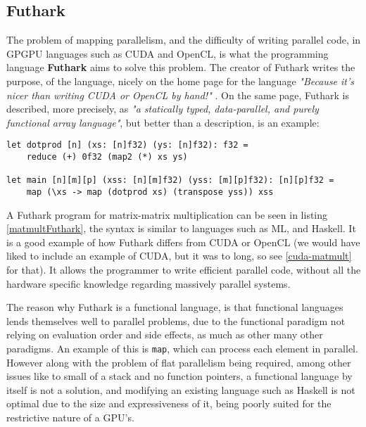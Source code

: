 \subsection{Futhark}
The problem of mapping parallelism, and the difficulty of writing parallel code, in GPGPU languages such as CUDA and OpenCL, is what the programming language \textbf{Futhark} aims to solve this problem. The creator of Futhark writes the purpose, of the language, nicely on the home page for the language \textit{"Because it’s nicer than writing CUDA or OpenCL by hand!"} \cite{futhark-home}. On the same page, Futhark is described, more precisely, as \textit{"a statically typed, data-parallel, and purely functional array language"}, but better than a description, is an example:
\begin{center}
\lstset{language=haskell}
\begin{lstlisting}
let dotprod [n] (xs: [n]f32) (ys: [n]f32): f32 =
	reduce (+) 0f32 (map2 (*) xs ys)

let main [n][m][p] (xss: [n][m]f32) (yss: [m][p]f32): [n][p]f32 =
	map (\xs -> map (dotprod xs) (transpose yss)) xss
\end{lstlisting}%
\label{matmultFuthark}
\end{center}
A Futhark program for matrix-matrix multiplication can be seen in listing \ref{matmultFuthark}, the syntax is similar to languages such as ML, and Haskell. It is a good example of how Futhark differs from CUDA or OpenCL (we would have liked to include an example of CUDA, but it was to long, so see \ref{cuda-matmult} for that). It allows the programmer to write efficient parallel code, without all the hardware specific knowledge regarding massively parallel systems. 

The reason why Futhark is a functional language, is that functional languages lends themselves well to parallel problems, due to the functional paradigm not relying on evaluation order and side effects, as much as other many other paradigms. An example of this is \texttt{map}, which can process each element in parallel. However along with the problem of flat parallelism being required, among other issues like to small of a stack and no function pointers, a functional language by itself is not a solution, and modifying an existing language such as Haskell is not optimal due to the size and expressiveness of it, being poorly suited for the restrictive nature of a GPU's. 

